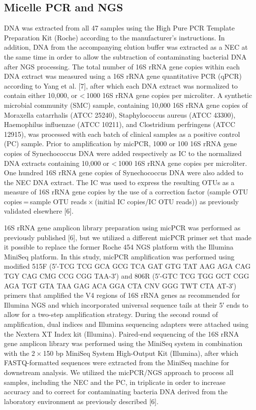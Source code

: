 \subsection*{Micelle PCR and NGS}

DNA was extracted from all 47 samples using the High Pure PCR Template Preparation Kit (Roche) according to the manufacturer’s instructions.
In addition, DNA from the accompanying elution buffer was extracted as a NEC at the same time in order to allow the subtraction of contaminating
bacterial DNA after NGS processing. The total number of 16S rRNA gene copies within each DNA extract was measured using a 16S rRNA gene
quantitative PCR (qPCR) according to Yang et al. [7], after which each DNA extract was normalized to contain either 10,000, or < 1000 16S rRNA
gene copies per microliter. A synthetic microbial community (SMC) sample, containing 10,000 16S rRNA gene copies of Moraxella catarrhalis (ATCC 25240),
Staphylococcus aureus (ATCC 43300), Haemophilus influenzae (ATCC 10211), and Clostridium perfringens (ATCC 12915), was processed with each batch
of clinical samples as a positive control (PC) sample. Prior to amplification by micPCR, 1000 or 100 16S rRNA gene copies of Synechococcus DNA
were added respectively as IC to the normalized DNA extracts containing 10,000 or < 1000 16S rRNA gene copies per microliter. One hundred 16S
rRNA gene copies of Synechococcus DNA were also added to the NEC DNA extract. The IC was used to express the resulting OTUs as a measure of
16S rRNA gene copies by the use of a correction factor (sample OTU copies = sample OTU reads × (initial IC copies/IC OTU reads)) as previously
validated elsewhere [6].

16S rRNA gene amplicon library preparation using micPCR was performed as previously published [6], but we utilized a different micPCR primer
set that made it possible to replace the former Roche 454 NGS platform with the Illumina MiniSeq platform. In this study, micPCR amplification
was performed using modified 515F (5′-TCG TCG GCA GCG TCA GAT GTG TAT AAG AGA CAG TGY CAG CMG CCG CGG TAA-3′) and 806R
(5′-GTC TCG TGG GCT CGG AGA TGT GTA TAA GAG ACA GGA CTA CNV GGG TWT CTA AT-3′) primers that amplified the V4 regions of 16S rRNA genes
as recommended for Illumina NGS and which incorporated universal sequence tails at their 5′ ends to allow for a two-step amplification
strategy. During the second round of amplification, dual indices and Illumina sequencing adapters were attached using the Nextera XT
Index kit (Illumina). Paired-end sequencing of the 16S rRNA gene amplicon library was performed using the MiniSeq system in combination
with the 2 × 150 bp MiniSeq System High-Output Kit (Illumina), after which FASTQ-formatted sequences were extracted from the MiniSeq
machine for downstream analysis. We utilized the micPCR/NGS approach to process all samples, including the NEC and the PC, in triplicate
in order to increase accuracy and to correct for contaminating bacteria DNA derived from the laboratory environment as previously described [6].

